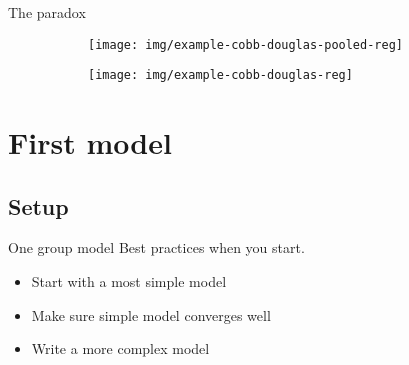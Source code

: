 \documentclass{beamer}
\begin{document}
\begin{frame}{The paradox}
    \begin{figure}
    \centering
        \begin{subfigure}[l]{0.45\linewidth}
             \centering
             \texttt{[image: img/example-cobb-douglas-pooled-reg]}
         \end{subfigure}
         \begin{subfigure}[r]{0.5\linewidth}
             \centering
             \texttt{[image: img/example-cobb-douglas-reg]}
         \end{subfigure}
    \end{figure}
\end{frame}
\section{First model}
\subsection{Setup}
\begin{frame}{One group model}
    Best practices when you start.
    \begin{itemize}
        \item Start with a most simple model
        \item Make sure simple model converges well
        \item Write a more complex model
    \end{itemize}
\end{frame}
\end{document}
